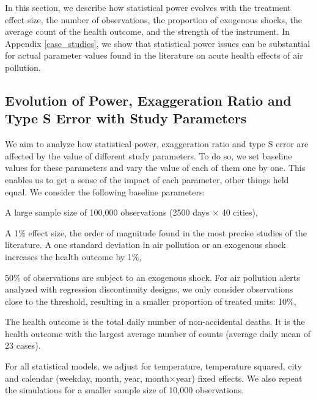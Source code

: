 \documentclass[12pt]{article}
\newenvironment{sitemize}{\itemize\addtolength{\itemsep}{-10pt}}{\enditemize} %
\begin{document}
        In this section, we describe how statistical power evolves with the treatment effect size, the number of observations, the proportion of exogenous shocks, the average count of the health outcome, and the strength of the instrument. In Appendix \ref{case_studies}, we show that statistical power issues can be substantial for actual parameter values found in the literature on acute health effects of air pollution. 

        \subsection{Evolution of Power, Exaggeration Ratio and Type S Error with Study Parameters}

        We aim to analyze how statistical power, exaggeration ratio and type S error are affected by the value of different study parameters. To do so, we set baseline values for these parameters and vary the value of each of them one by one. This enables us to get a sense of the impact of each parameter, other things held equal. We consider the following baseline parameters:

            \begin{sloppypar}
            \begin{sitemize}
                \item A large sample size of 100,000 observations (2500 days × 40 cities),
                \item A 1\% effect size, the order of magnitude found in the most precise studies of the literature. A one standard deviation in air pollution or an exogenous shock increases the health outcome by 1\%,
                \item 50\% of observations are subject to an exogenous shock. For air pollution alerts analyzed with regression discontinuity designs, we only consider observations close to the threshold, resulting in a smaller proportion of treated units: 10\%,
                \item The health outcome is the total daily number of non-accidental deaths. It is the health outcome with the largest average number of counts (average daily mean of 23 cases).
            \end{sitemize}
            \end{sloppypar}
            
        \noindent For all statistical models, we adjust for temperature, temperature squared, city and calendar (weekday, month, year, month$\times$year) fixed effects. We also repeat the simulations for a smaller sample size of 10,000 observations.
        
\end{document}
